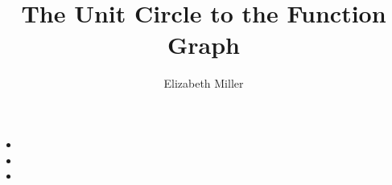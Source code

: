 \documentclass{ximera}
\author{Elizabeth Miller}
\title{The Unit Circle to the Function Graph}
\begin{document}
\begin{abstract}
\end{abstract}
\maketitle


\begin{objectives}

\item
\begin{itemize}
	\item 
	\item 
	\item 
\end{itemize}




\end{objectives}
\end{document}
